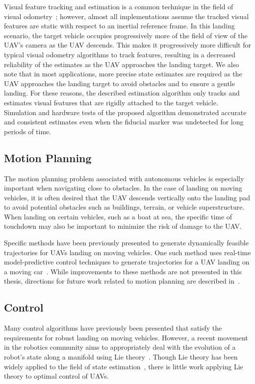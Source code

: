 Visual feature
tracking and estimation is a common technique in the field of visual
odometry~\cite{qin2018vins}; however, almost all implementations assume the
tracked visual features are static with respect to an inertial reference frame.
In this landing scenario, the target vehicle occupies progressively more of the
field of view of the UAV's camera as the UAV descends. This makes it progressively
more difficult for typical visual odometry algorithms to track features,
resulting in a decreased
reliability of the estimates as the UAV approaches the landing target.
We also note that in most
applications, more precise state estimates are required as the UAV
approaches
the landing target to avoid obstacles and to ensure a gentle landing.
For these reasons, the described estimation algorithm
only tracks and estimates visual features that are rigidly attached to the
target vehicle.
Simulation and hardware tests of the proposed algorithm demonstrated accurate and consistent estimates
even when the fiducial marker was undetected
for long periods of time.

\subsection{Motion Planning}
The motion planning problem associated with autonomous vehicles is especially
important when 
navigating close to obstacles. In the case of landing on moving vehicles, it is
often desired that the UAV descends vertically onto the landing pad to avoid
potential obstacles such as buildings, terrain, or vehicle superstructure.
When landing on certain vehicles, such as a boat at sea, the specific time of
touchdown may also be important to minimize the risk of damage to the UAV.

Specific methods have been previously
presented to generate dynamically feasible trajectories for UAVs landing on moving
vehicles. One such method uses real-time model-predictive control techniques to
generate trajectories for a UAV landing on a moving car~\cite{baca2019autonomous}.
While improvements to these methods are not presented in this thesis, 
directions for future work related to motion planning are described
in~.

\subsection{Control}
Many control algorithms have previously been presented that satisfy the
requirements for robust landing on moving vehicles.
However, a recent
movement in the robotics community aims to appropriately deal with the evolution of a
robot's state along a manifold using Lie theory~\cite{sola2018micro}. Though
Lie theory has been widely applied to the field of state
estimation~\cite{sola2017quaternion, koch2017relative}, there is little 
work applying Lie theory to optimal control of UAVs.

